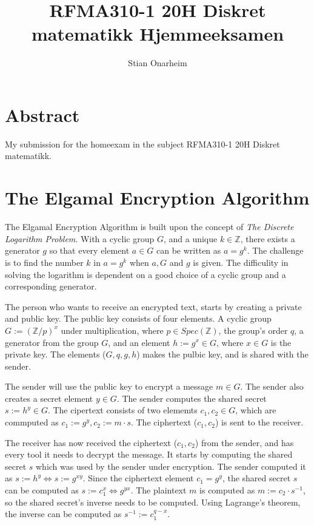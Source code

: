 \documentclass{article}
\author{Stian Onarheim}
\title{RFMA310-1 20H Diskret matematikk Hjemmeeksamen}
\begin{document}
\maketitle
\newpage
\tableofcontents
\newpage

\section{Abstract}
My submission for the homeexam in the subject RFMA310-1 20H Diskret matematikk.

\section{The Elgamal Encryption Algorithm}
The Elgamal Encryption Algorithm is built upon the concept of \textit{The Discrete Logarithm Problem}. With a cyclic group $G$, and a unique $k \in \mathbb{Z}$, there exists a generator $g$ so that every element $a \in G$ can be written as $a = g^k$. The challenge is to find the number $k$ in $a = g^k$ when $a, G$ and $g$ is given. The difficulity in solving the logarithm is dependent on a good choice of a cyclic group and a corresponding generator.

The person who wants to receive an encrypted text, starts by creating a private and public key. The public key consists of four elements. A cyclic group $G := (\mathbb{Z}/p)^x$ under multiplication, where $p \in Spec(\mathbb{Z})$, the group's order $q$, a generator from the group $G$, and an element $h := g^x \in G$, where $x \in G$ is the private key. The elements ($G, q, g, h$) makes the pulbic key, and is shared with the sender.

The sender will use the public key to encrypt a message $m \in G$. The sender also creates a secret element $y \in G$. The sender computes the shared secret $s := h^y \in G$. The cipertext consists of two elememts $c_1, c_2 \in G$, which are commputed as $c_1 := g^y, c_2 := m \cdot s$. The ciphertext ($c_1,c_2$) is sent to the receiver.

The receiver has now received the ciphertext ($c_1, c_2$) from the sender, and has every tool it needs to decrypt the message. It starts by computing the shared secret $s$ which was used by the sender under encryption. The sender computed it as $s := h^y \Leftrightarrow s:= g^{xy}$. Since the ciphertext element $c_1 = g^y$, the shared secret $s$ can be computed as $s := c_1^x \Leftrightarrow g^{yx}$. The plaintext $m$ is computed as $m := c_2 \cdot s^{-1}$, so the shared secret's inverse needs to be computed. Using Lagrange's theorem, the inverse can be computed as $s^{-1} := c_1^{q-x}$.
\end{document}
